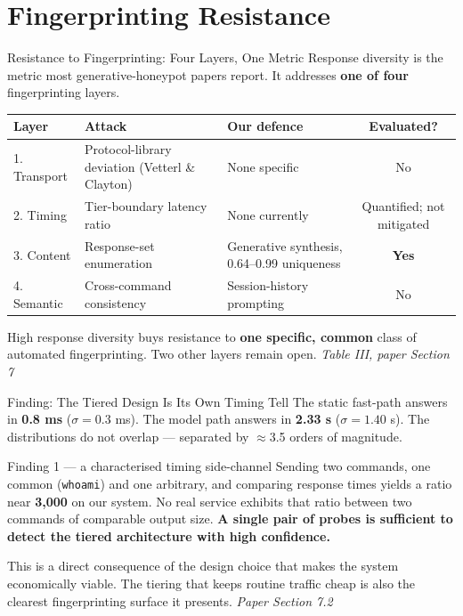 \documentclass[aspectratio=169, 11pt]{beamer}
\newcommand{\srcnote}[1]{{\footnotesize\color{gray}\textit{#1}}}
\begin{document}
\section{Fingerprinting Resistance}
\begin{frame}{Resistance to Fingerprinting: Four Layers, One Metric}
    Response diversity is the metric most generative-honeypot papers report. It addresses \textbf{one of four} fingerprinting layers.
    \scriptsize
    \renewcommand{\arraystretch}{1.3}
    \begin{tabular}{|l|p{3.5cm}|p{3.3cm}|c|}
        \hline
        \textbf{Layer} & \textbf{Attack} & \textbf{Our defence} & \textbf{Evaluated?} \\
        \hline
        1. Transport & Protocol-library deviation (Vetterl \& Clayton) & None specific & No \\
        \hline
        2. Timing & Tier-boundary latency ratio & None currently & Quantified; not mitigated \\
        \hline
        \rowcolor{amritaMaroon!15} 3. Content & Response-set enumeration & Generative synthesis, 0.64--0.99 uniqueness & \textbf{Yes} \\
        \hline
        4. Semantic & Cross-command consistency & Session-history prompting & No \\
        \hline
    \end{tabular}
    \vspace{2mm}
    \normalsize
    High response diversity buys resistance to \textbf{one specific, common} class of automated fingerprinting. Two other layers remain open.
    \srcnote{Table III, paper Section 7}
\end{frame}

\begin{frame}{Finding: The Tiered Design Is Its Own Timing Tell}
    The static fast-path answers in \textbf{0.8 ms} ($\sigma=0.3$ ms). The model path answers in \textbf{2.33 s} ($\sigma=1.40$ s). The distributions do not overlap --- separated by $\approx$3.5 orders of magnitude.
    \begin{block}{\small Finding 1 --- a characterised timing side-channel}
        \small Sending two commands, one common (\texttt{whoami}) and one arbitrary, and comparing response times yields a ratio near \textbf{3{,}000} on our system. No real service exhibits that ratio between two commands of comparable output size. \textbf{A single pair of probes is sufficient to detect the tiered architecture with high confidence.}
    \end{block}
    \vspace{2mm}
    This is a direct consequence of the design choice that makes the system economically viable. The tiering that keeps routine traffic cheap is also the clearest fingerprinting surface it presents.
    \srcnote{Paper Section 7.2}
\end{frame}
\end{document}
